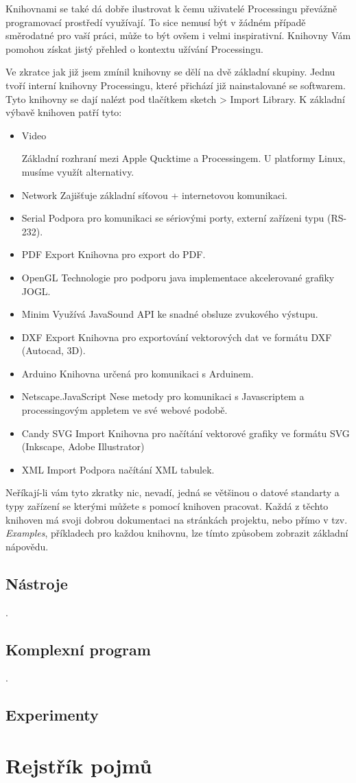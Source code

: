 \documentclass[12pt,twopage]{book}
\newcommand{\oddil}[1]{\section{#1}\label{sec:#1}}
\begin{document}
Knihovnami se také dá dobře ilustrovat k čemu uživatelé Processingu převážně programovací prostředí využívají. To sice nemusí být v žádném případě směrodatné pro vaší práci, může to být ovšem i velmi inspirativní. Knihovny Vám pomohou získat jistý přehled o kontextu užívání Processingu.

Ve zkratce jak již jsem zmínil knihovny se dělí na dvě základní skupiny. Jednu tvoří interní knihovny Processingu, které přichází již nainstalované se softwarem. Tyto knihovny se dají nalézt pod tlačítkem sketch > Import Library.
K základní výbavě knihoven patří tyto:

\begin{itemize}
\item
Video

Základní rozhraní mezi Apple Qucktime a Processingem. U platformy Linux, musíme využít alternativy.

\item
Network
Zajišťuje základní síťovou + internetovou komunikaci. 

\item
Serial
Podpora pro komunikaci se sériovými porty, externí zařízeni typu (RS-232).

\item
PDF Export
Knihovna pro export do PDF.

\item
OpenGL
Technologie pro podporu java implementace akcelerované grafiky JOGL.

\item
Minim
Využívá JavaSound API ke snadné obsluze zvukového výstupu.

\item
DXF Export
Knihovna pro exportování vektorových dat ve formátu DXF (Autocad, 3D).

\item
Arduino
Knihovna určená pro komunikaci s Arduinem.

\item
Netscape.JavaScript
Nese metody pro komunikaci s Javascriptem a processingovým appletem ve své webové podobě.

\item
Candy SVG Import
Knihovna pro načítání vektorové grafiky ve formátu SVG (Inkscape, Adobe Illustrator)

\item
XML Import
Podpora načítání XML tabulek.
\end{itemize}

Neříkají-li vám tyto zkratky nic, nevadí, jedná se většinou o datové standarty a typy zařízení se kterými můžete s pomocí knihoven pracovat. Každá z těchto knihoven má svoji dobrou dokumentaci na stránkách projektu, nebo přímo v tzv. {\em Examples}, příkladech pro každou knihovnu, lze tímto způsobem zobrazit základní nápovědu. 




\oddil{Nástroje}
.
\newpage
\oddil{Komplexní program}
.
\newpage
\oddil{Experimenty}


\chapter{Rejstřík pojmů}
\printglossaries
\printindex


\end{document}
